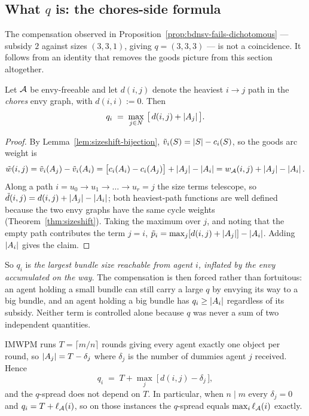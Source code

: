 \subsection{What \texorpdfstring{$q$}{q} is: the chores-side formula}
\label{sec:approach6-qformula}

The compensation observed in Proposition~\ref{prop:bdnsv-fails-dichotomous} ---
subsidy $2$ against sizes $(3,3,1)$, giving $q = (3,3,3)$ --- is not a
coincidence. It follows from an identity that removes the goods picture from this
section altogether.

\begin{lemma}
\label{lem:q-formula}
Let $\mathcal{A}$ be envy-freeable and let $d(i,j)$ denote the heaviest $i \to j$ path
in the \emph{chores} envy graph, with $d(i,i) := 0$. Then
\[
  q_i \;=\; \max_{j \in \agents}\ \bigl[\, d(i,j) + \abs{\bundle{j}} \,\bigr].
\]
\end{lemma}

\begin{proof}
By Lemma~\ref{lem:sizeshift-bijection}, $\tilde v_i(S) = \left\lvert S\right\rvert - c_i(S)$, so
the goods arc weight is
\[
  \tilde w(i,j) = \tilde v_i(A_{j}) - \tilde v_i(A_{i})
   = \bigl[c_i(A_{i}) - c_i(A_{j})\bigr]
     + \left\lvert A_{j}\right\rvert - \left\lvert A_{i}\right\rvert
   = w_{\mathcal{A}}(i,j) + \left\lvert A_{j}\right\rvert - \left\lvert A_{i}\right\rvert .
\]
Along a path $i = u_0 \to u_1 \to \dots \to u_r = j$ the size terms telescope, so
$\tilde d(i,j) = d(i,j) + \left\lvert A_{j}\right\rvert - \left\lvert A_{i}\right\rvert$; both heaviest-path
functions are well defined because the two envy graphs have the same cycle
weights (Theorem~\ref{thm:sizeshift}). Taking the maximum over $j$, and noting
that the empty path contributes the term $j = i$,
$\tilde{p}_i = \max_j[d(i,j) + \left\lvert A_{j}\right\rvert] - \left\lvert A_{i}\right\rvert$.
Adding $\left\lvert A_{i}\right\rvert$ gives the claim.
\end{proof}

So $q_i$ is \emph{the largest bundle size reachable from agent $i$, inflated by the
envy accumulated on the way}. The compensation is then forced rather than
fortuitous: an agent holding a small bundle can still carry a large $q$ by envying
its way to a big bundle, and an agent holding a big bundle has $q_i \ge
\left\lvert A_{i}\right\rvert$ regardless of its subsidy. Neither term is controlled alone
because $q$ was never a sum of two independent quantities.

\begin{corollary}
\label{cor:q-imwpm}
IMWPM runs $T = \lceil m/n \rceil$ rounds giving every agent exactly one object
per round, so $\left\lvert A_{j}\right\rvert = T - \delta_j$ where $\delta_j$ is the number of
dummies agent $j$ received. Hence
\[
  q_i \;=\; T + \max_{j}\ \bigl[\, d(i,j) - \delta_j \,\bigr],
\]
and the $q$-spread does not depend on $T$. In particular, when $n \mid m$ every
$\delta_j = 0$ and $q_i = T + \ell_{\mathcal{A}}(i)$, so on those instances the
$q$-spread equals $\max_i \ell_{\mathcal{A}}(i)$ exactly.
\end{corollary}

